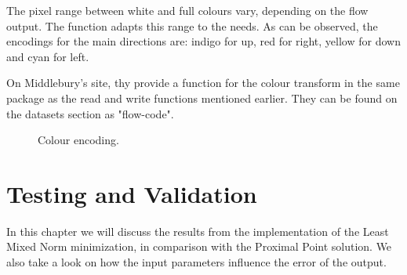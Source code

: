 \documentclass[12pt,a4paper,twoside]{report}
\begin{document}
{ The pixel range between white and full colours vary, depending on the flow output. The function adapts this range to the needs. As can be observed, the encodings for the main directions are: indigo for up, red for right, yellow for down and cyan for left.
 
 
  On Middlebury's site, thy provide a function for the colour transform in the same package as the read and write functions mentioned earlier. They can be found on the datasets section as "flow-code".  

\begin{figure}
	\label{colors}
	\centering
	\caption{Colour encoding.}
\end{figure}


\chapter{Testing and Validation}

In this chapter we will discuss the results from the implementation of the Least Mixed Norm minimization, in comparison with the Proximal Point solution. We also take a look on how the input parameters influence the error of the output. 

}
\end{document}
